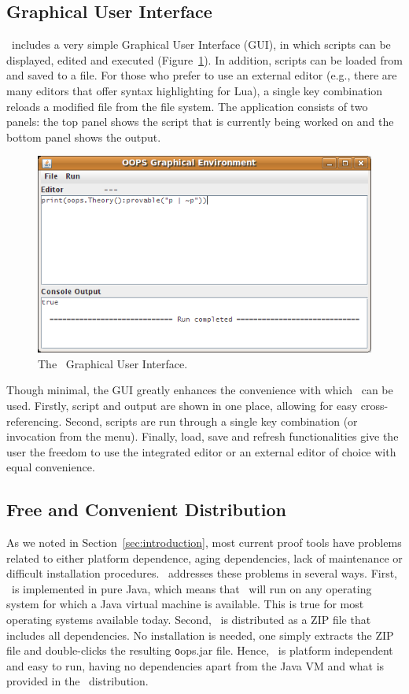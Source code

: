 \subsection{Graphical User Interface}

\oops\ includes a very simple Graphical User Interface (GUI), in which scripts
can be displayed, edited and executed (Figure~\ref{fig:gui}). In addition,
scripts can be loaded from and saved to a file. For those who prefer to use an
external editor (e.g., there are many editors that offer syntax highlighting
for Lua), a single key combination reloads a modified file from the
file system. The application consists of two panels: the top panel shows the
script that is currently being worked on and the bottom panel shows the
output.

\begin{figure}[p]
\centering
\includegraphics[scale=.55]{images/gui}
\caption{The \oops\ Graphical User Interface.}
\label{fig:gui}
\end{figure}

Though minimal, the GUI greatly enhances the convenience with which \oops\ can
be used. Firstly, script and output are shown in one place, allowing for easy
cross-referencing. Second, scripts are run through a single key combination
(or invocation from the menu). Finally, load, save and refresh functionalities
give the user the freedom to use the integrated editor or an external editor
of choice with equal convenience.

\subsection{Free and Convenient Distribution}

As we noted in Section~\ref{sec:introduction}, most current proof tools have
problems related to either platform dependence, aging dependencies, lack of
maintenance or difficult installation procedures. \oops\ addresses these
problems in several ways.
First, \oops\ is implemented in pure Java, which means that \oops\ will run on
any operating system for which a Java virtual machine is available. This is
true for most operating systems available today.
Second, \oops\ is distributed as a ZIP file that includes all dependencies.
No installation is needed, one simply extracts the ZIP file and double-clicks
the resulting {\texttt oops.jar} file.
Hence, \oops\ is platform independent and easy to run, having no dependencies
apart from the Java VM and what is provided in the \oops\ distribution.

